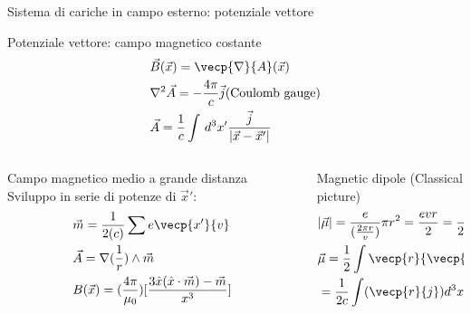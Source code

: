 \begin{frame}{Sistema di cariche in campo esterno: potenziale vettore}

        \begin{block}{Potenziale vettore: campo magnetico costante}
    \begin{align*}
        &\vec{B}(\vec{x})=\vecp{\nabla}{A}(\vec{x})\\
        &\nabla^2\vec{A}=-\frac{4\pi}{c}\vec{j}(\text{Coulomb gauge})\\ &\vec{A}=\frac{1}{c}\int\,d^3x'\frac{\vec{j}}{|\vec{x}-\vec{x}'|}
    \end{align*}
    \end{block}
   
       \begin{columns}[T]
       \begin{column}{0.5\textwidth}
        \begin{block}{Campo magnetico medio a grande distanza}
        Sviluppo in serie di potenze di $\vec{x}'$:
        \begin{align*}
            &\vec{m}=\frac{1}{2(c)}\sum e\vecp{x'}{v}\\
            &\vec{A}=\nabla(\frac{1}{r})\wedge\vec{m}\\
            &B(\vec{x})=(\frac{4\pi}{\mu_0})[\frac{3\hat{x}(\hat{x}\cdot\vec{m})-\vec{m}}{x^3}]
        \end{align*}
        \end{block}
   
       \end{column}
       \begin{column}{0.5\textwidth}
            \begin{block}{Magnetic dipole (Classical picture)}
\begin{align*}
    &|\vec{\mu}|=\frac{e}{(\frac{2\pi r}{v})}\pi r^2=\frac{evr}{2}=\frac{e}{2m(c)}|\vec{l}|\\
    &\vec{\mu}=\frac{1}{2}\int\vecp{r}{\vecp{\nabla}{M}}d^3x\\
    &=\frac{1}{2c}\int(\vecp{r}{j})d^3x'
\end{align*}
\end{block}
       \end{column}
       \end{columns}

    
\end{frame}

